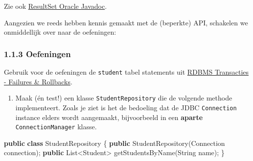 \documentclass[
]{article}
\newenvironment{Shaded}{}{}
\newcommand{\BuiltInTok}[1]{\textcolor[rgb]{0.00,0.50,0.00}{#1}}
\newcommand{\FunctionTok}[1]{\textcolor[rgb]{0.02,0.16,0.49}{#1}}
\newcommand{\KeywordTok}[1]{\textcolor[rgb]{0.00,0.44,0.13}{\textbf{#1}}}
\newcommand{\NormalTok}[1]{#1}
\newcommand{\OperatorTok}[1]{\textcolor[rgb]{0.40,0.40,0.40}{#1}}
\providecommand{\tightlist}{%
  \setlength{\itemsep}{0pt}\setlength{\parskip}{0pt}}
\begin{document}
Zie ook
\href{https://docs.oracle.com/javase/7/docs/api/java/sql/ResultSet.html}{ResultSet
Oracle Javadoc}.

Aangezien we reeds hebben kennis gemaakt met de (beperkte) API,
schakelen we onmiddellijk over naar de oefeningen:

\subsubsection{1.1.3 Oefeningen}\label{oefeningen}

Gebruik voor de oefeningen de \texttt{student} tabel statements uit
\href{/transacties/failures-rollbacks/}{RDBMS Transacties - Failures \&
Rollbacks}.

\begin{enumerate}
\def\labelenumi{\arabic{enumi}.}
\tightlist
\item
  Maak (én test!) een klasse \texttt{StudentRepository} die de volgende
  methode implementeert. Zoals je ziet is het de bedoeling dat de JDBC
  \texttt{Connection} instance elders wordt aangemaakt, bijvoorbeeld in
  een \textbf{aparte} \texttt{ConnectionManager} klasse.
\end{enumerate}

\begin{Shaded}
\begin{Highlighting}[]
\KeywordTok{public} \KeywordTok{class}\NormalTok{ StudentRepository }\OperatorTok{\{}
        \KeywordTok{public} \FunctionTok{StudentRepository}\OperatorTok{(}\BuiltInTok{Connection}\NormalTok{ connection}\OperatorTok{);}
        \KeywordTok{public} \BuiltInTok{List}\OperatorTok{\textless{}}\NormalTok{Student}\OperatorTok{\textgreater{}} \FunctionTok{getStudentsByName}\OperatorTok{(}\BuiltInTok{String}\NormalTok{ name}\OperatorTok{);}
\OperatorTok{\}}
\end{Highlighting}
\end{Shaded}
\end{document}
